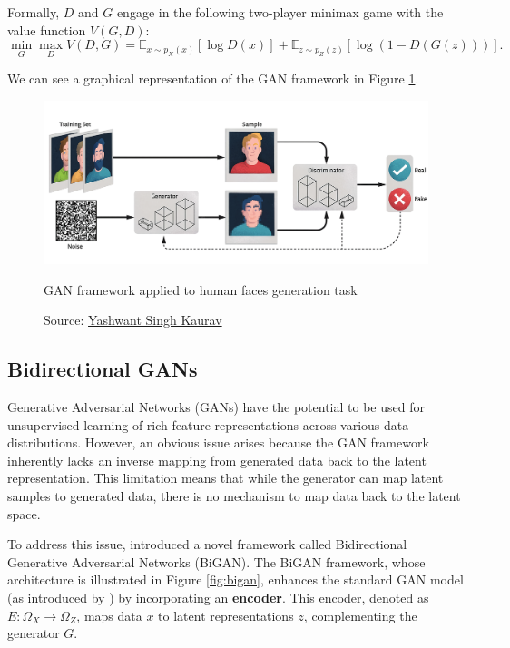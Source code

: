 Formally, \( D \) and \( G \) engage in the following
two-player minimax game with the value function \( V(G, D) \):
\begin{equation}
\min_G \max_D V(D, G) = \mathbb{E}_{x \sim p_X(x)}[\log D(x)] + \mathbb{E}_{z \sim p_Z(z)}[\log (1 - D(G(z)))].
\end{equation}

We can see a graphical representation of the GAN framework in Figure \ref{fig:gan}.
\begin{figure}[h]
    \centering
    \includegraphics[width=\textwidth]{figures/ch3/5.gan.png}
    \caption{GAN framework applied to human faces generation task}
    \vspace{-10px}
    \caption*{\scriptsize{Source: \href{https://www.linkedin.com/pulse/exploring-fascinating-realm-generative-adversarial-networks-kaurav/}{Yashwant Singh Kaurav}}}
    \label{fig:gan}
\end{figure}

\subsection{Bidirectional GANs}
\label{sec:bigan}

Generative Adversarial Networks (GANs) have the potential to be used
for unsupervised learning of rich feature representations across various
data distributions. However, an obvious issue arises because
the GAN framework inherently lacks an inverse mapping from generated data
back to the latent representation.
This limitation means that while the generator can map latent samples
to generated data, there is no mechanism to map data back to the latent space.

To address this issue, \cite{donahue2017} introduced a novel framework
called Bidirectional Generative Adversarial Networks (BiGAN).
The BiGAN framework, whose architecture is illustrated
in Figure \ref{fig:bigan}, enhances the standard GAN model
(as introduced by \cite{goodfellow2014}) by incorporating an \textbf{encoder}.
This encoder, denoted as \( E: \Omega_X \rightarrow \Omega_Z \),
maps data \( x \) to latent representations
\( z \), complementing the generator \( G \).

